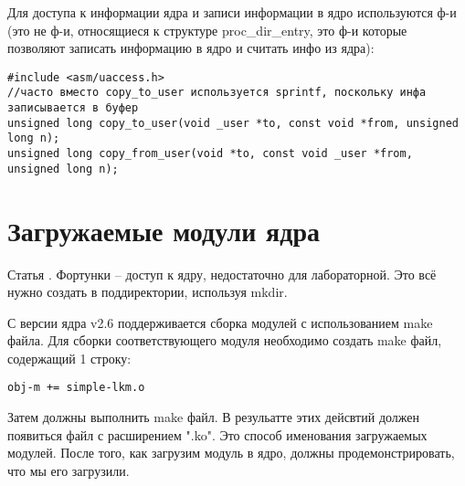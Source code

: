 Для доступа к информации ядра и записи информации в ядро используются ф-и (это не ф-и, относящиеся к структуре proc\_dir\_entry, это ф-и которые позволяют записать информацию в ядро и считать инфо из ядра):
\begin{lstlisting}
#include <asm/uaccess.h>
//часто вместо copy_to_user используется sprintf, поскольку инфа записывается в буфер 
unsigned long copy_to_user(void _user *to, const void *from, unsigned long n); 
unsigned long copy_from_user(void *to, const void _user *from, unsigned long n);
\end{lstlisting}

\section{Загружаемые модули ядра}
Статья \cite{IBM_lproc}. 
Фортунки – доступ к ядру, недостаточно для лабораторной. Это всё нужно создать в поддиректории, используя mkdir.

С версии ядра v2.6 поддерживается сборка модулей с использованием make файла. Для сборки соответствующего модуля необходимо создать make файл, содержащий 1 строку: 
\begin{lstlisting}[label=proc_mkdir, caption=make file]
obj-m += simple-lkm.o
\end{lstlisting}

Затем должны выполнить make файл. В резульатте этих дейсвтий должен появиться файл с расширением ".ko". Это способ именования загружаемых модулей. После того, как загрузим модуль в ядро, должны продемонстрировать, что мы его загрузили.